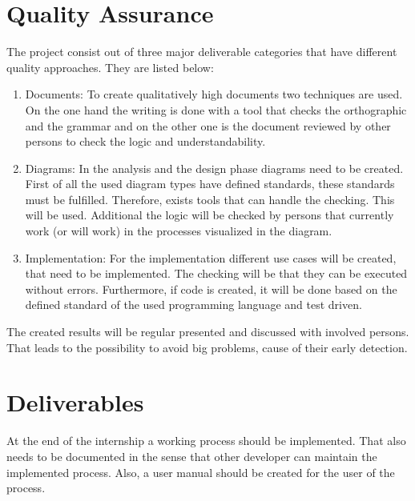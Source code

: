 \section{Quality Assurance}
The project consist out of three major deliverable categories that have different quality approaches. They are listed below:
\begin{enumerate}
	\item Documents: \newline
	To create qualitatively high documents two techniques are used. On the one hand the writing is done with a tool that checks the orthographic and the grammar and on the other one is the document reviewed by other persons to check the logic and understandability. 
	\item Diagrams: \newline
	In the analysis and the design phase diagrams need to be created. First of all the used diagram types have defined standards, these standards must be fulfilled. Therefore, exists tools that can handle the checking. This will be used. Additional the logic will be checked by persons that currently work (or will work) in the processes visualized in the diagram. 
	\item Implementation: \newline
	For the implementation different use cases will be created, that need to be implemented. The checking will be that they can be executed without errors. Furthermore, if code is created, it will be done based on the defined standard of the used programming language and test driven.
\end{enumerate}
The created results will be regular presented and discussed with involved persons. That leads to the possibility to avoid big problems, cause of their early detection.

\section{Deliverables}
At the end of the internship a working process should be implemented. That also needs to be documented in the sense that other developer can maintain the implemented process. Also, a user manual should be created for the user of the process.

